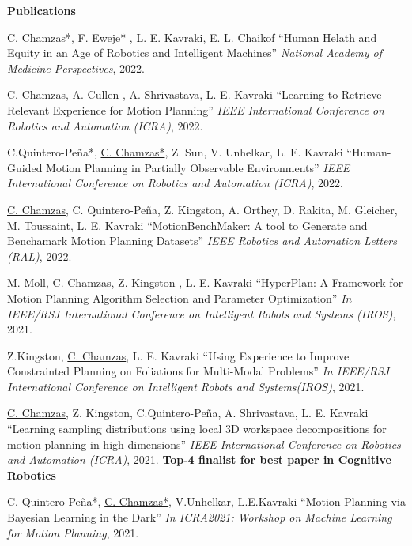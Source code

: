 \documentclass[letterpaper,11pt]{article}
\newcommand{\resheading}[1]{{\large \colorbox{mygrey}{\begin{minipage}{\textwidth}{\textbf{#1 \vphantom{p\^{E}}}}\end{minipage}}}}
\begin{document}
\resheading{Publications }
\begingroup
	\renewcommand{\section}[2]{}%
\begin{thebibliography}{9}
     \underline{C. Chamzas*}, F. Eweje* , L. E. Kavraki, E. L. Chaikof 
	``Human Helath and Equity in an Age of Robotics and Intelligent Machines''
    \textit{National Academy of Medicine Perspectives}, 2022.

     \underline{C. Chamzas}, A. Cullen , A. Shrivastava, L. E. Kavraki
	``Learning to Retrieve Relevant Experience for Motion Planning''
    \textit{IEEE International Conference on Robotics and Automation (ICRA)}, 2022.

     C.Quintero-Peña*, \underline{C. Chamzas*}, Z. Sun, V. Unhelkar, L. E. Kavraki
	``Human-Guided Motion Planning in Partially Observable Environments''
    \textit{IEEE International Conference on Robotics and Automation (ICRA)}, 2022.

     \underline{C. Chamzas}, C. Quintero-Peña, Z. Kingston, A. Orthey, D. Rakita, M. Gleicher, M. Toussaint, L. E. Kavraki
     ``MotionBenchMaker: A tool to Generate and Benchamark Motion Planning Datasets''
     \textit{IEEE Robotics and Automation Letters (RAL)}, 2022.  

     M. Moll, \underline{C. Chamzas}, Z. Kingston , L. E. Kavraki
     ``HyperPlan: A Framework for Motion Planning Algorithm Selection and Parameter Optimization''
     \textit{In IEEE/RSJ International Conference on Intelligent Robots and Systems (IROS)}, 2021.  

     Z.Kingston, \underline{C. Chamzas}, L. E. Kavraki
     ``Using Experience to Improve Constrainted Planning on Foliations for Multi-Modal Problems''
     \textit{In IEEE/RSJ International Conference on Intelligent Robots and Systems(IROS)}, 2021.  

    \underline{C. Chamzas}, Z. Kingston, C.Quintero-Peña, A. Shrivastava, L. E. Kavraki
	``Learning sampling distributions using local 3D workspace decompositions for motion planning in high dimensions''
    \textit{IEEE International Conference on Robotics and Automation (ICRA)}, 2021.
    \textbf{Top-4 finalist for best paper in Cognitive Robotics} 

     C. Quintero-Peña*, \underline{C. Chamzas*}, V.Unhelkar, L.E.Kavraki
	``Motion Planning via Bayesian Learning in the Dark''
    \textit{In ICRA2021: Workshop on Machine Learning for Motion Planning}, 2021.  


\end{thebibliography}
\end{document}
